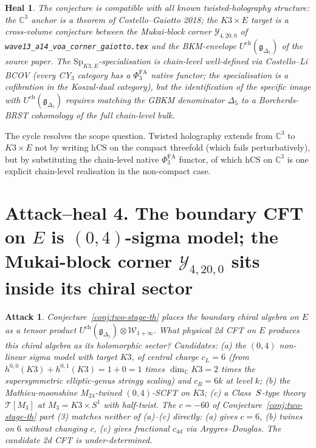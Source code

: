 \documentclass[11pt]{article}
\newtheorem*{attack}{Attack}
\newtheorem*{heal}{Heal}
\providecommand{\C}{\mathbb{C}}
\providecommand{\cT}{\mathcal{T}}
\providecommand{\cW}{\mathcal{W}}
\providecommand{\cY}{\mathcal{Y}}
\providecommand{\fg}{\mathfrak{g}}
\providecommand{\hCS}{\mathrm{hCS}}
\providecommand{\Sp}{\mathrm{Sp}}
\begin{document}
\begin{heal}
The conjecture is compatible with all known twisted-holography
structure: the $\C^3$ anchor is a theorem of Costello--Gaiotto 2018;
the $K3\times E$ target is a cross-volume conjecture between the
Mukai-block corner $\cY_{4,20,0}$ of
\texttt{wave13\_a14\_voa\_corner\_gaiotto.tex} and the BKM-envelope
$U^{\mathrm{ch}}(\fg_{\Delta_5})$ of the source paper. The
$\Sp_{K3,E}$-specialisation is chain-level well-defined via
Costello--Li BCOV (every CY$_3$ category has a $\Phi^{\mathrm{FA}}_3$
native functor; the specialisation is a cofibration in the Koszul-dual
category), but the identification of the specific image with
$U^{\mathrm{ch}}(\fg_{\Delta_5})$ requires matching the GBKM denominator
$\Delta_5$ to a Borcherds-BRST cohomology of the full chain-level bulk.
\end{heal}

The cycle resolves the scope question. Twisted holography extends from
$\C^3$ to $K3\times E$ not by writing $\hCS$ on the compact threefold
(which fails perturbatively), but by substituting the chain-level
native $\Phi^{\mathrm{FA}}_3$ functor, of which $\hCS$ on $\C^3$ is
one explicit chain-level realisation in the non-compact case.

\section{Attack--heal 4. The boundary CFT on $E$ is $(0,4)$-sigma
  model; the Mukai-block corner $\cY_{4,20,0}$ sits inside its chiral
  sector}
\label{sec:cycle4}

\begin{attack}
Conjecture~\ref{conj:two-stage-th} places the boundary chiral algebra
on $E$ as a tensor product
$U^{\mathrm{ch}}(\fg_{\Delta_5}) \otimes \cW_{1+\infty}$. What
\emph{physical} 2d CFT on $E$ produces this chiral algebra as its
holomorphic sector? Candidates: (a) the $(0,4)$ non-linear sigma model
with target $K3$, of central charge $c_L = 6$ (from $h^{0,0}(K3) +
h^{0,1}(K3) = 1 + 0 = 1$ times $\dim_\C K3 = 2$ times the
supersymmetric elliptic-genus stringy scaling) and $c_R = 6 k$ at
level $k$; (b) the Mathieu-moonshine $M_{24}$-twined $(0,4)$-SCFT on
$K3$; (c) a Class~$S$-type theory $\cT[M_3]$ at $M_3 = K3\times S^1$
with half-twist. The $c = -60$ of Conjecture~\ref{conj:two-stage-th}
part (3) matches neither of (a)--(c) directly: (a) gives $c = 6$, (b)
twines on $6$ without changing $c$, (c) gives fractional $c_{4d}$ via
Argyres--Douglas. The candidate 2d CFT is under-determined.
\end{attack}
\end{document}
